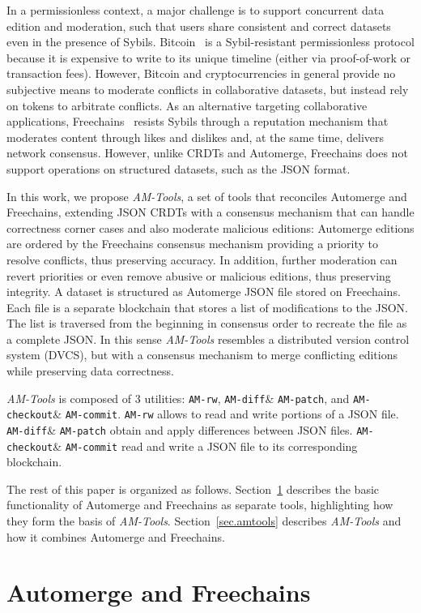 \documentclass[12pt]{article}
\newcommand{\AMT}      {\emph{AM-Tools}\xspace}
\newcommand{\amrw}       {\texttt{AM-rw}\xspace}
\newcommand{\amdiff}     {\texttt{AM-diff}\xspace}
\newcommand{\ampatch}    {\texttt{AM-patch}\xspace}
\newcommand{\amcheckout} {\texttt{AM-checkout}\xspace}
\newcommand{\amcommit}   {\texttt{AM-commit}\xspace}
\begin{document}
In a permissionless context, a major challenge is to support concurrent data
edition and moderation, such that users share consistent and correct datasets
even in the presence of Sybils.
%
Bitcoin~\cite{nakamoto2008bitcoin} is a Sybil-resistant permissionless protocol
because it is expensive to write to its unique timeline (either via
proof-of-work or transaction fees).
However, Bitcoin and cryptocurrencies in general provide no subjective means to
moderate conflicts in collaborative datasets, but instead rely on tokens to
arbitrate conflicts.
%
As an alternative targeting collaborative applications,
Freechains~\cite{sant2020freechains} resists Sybils through a reputation
mechanism that moderates content through likes and dislikes and, at the same
time, delivers network consensus.
However, unlike CRDTs and Automerge, Freechains does not support operations on
structured datasets, such as the JSON format.

In this work, we propose \AMT, a set of tools that reconciles Automerge and
Freechains, extending JSON CRDTs with a consensus mechanism that can handle
correctness corner cases and also moderate malicious editions:
Automerge editions are ordered by the Freechains consensus mechanism providing
a priority to resolve conflicts, thus preserving accuracy.
In addition, further moderation can revert priorities or even remove abusive or
malicious editions, thus preserving integrity.
%
A dataset is structured as Automerge JSON file stored on Freechains.
Each file is a separate blockchain that stores a list of modifications to the
JSON.
The list is traversed from the beginning in consensus order to recreate the
file as a complete JSON.
%
In this sense \AMT resembles a distributed version control system (DVCS), but
with a consensus mechanism to merge conflicting editions while
preserving data correctness.

\AMT is composed of 3 utilities:
    \amrw,
    \amdiff \& \ampatch, and
    \amcheckout \& \amcommit.
%
\amrw allows to read and write portions of a JSON file.
\amdiff \& \ampatch obtain and apply differences between JSON files.
\amcheckout \& \amcommit read and write a JSON file to its corresponding
blockchain.

The rest of this paper is organized as follows.
Section~\ref{sec.both} describes the basic functionality of Automerge and
Freechains as separate tools, highlighting how they form the basis of
\AMT.
Section~\ref{sec.amtools} describes \AMT and how it combines Automerge and
Freechains.

\section{Automerge and Freechains}
\label{sec.both}
\end{document}
